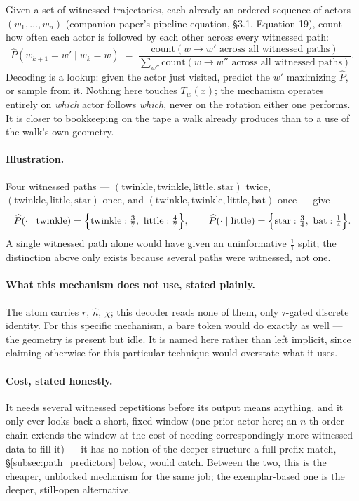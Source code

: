 \documentclass[12pt, a4paper]{article}
\begin{document}
Given a set of witnessed trajectories, each already an ordered
sequence of actors $(w_1,\ldots,w_n)$ (companion paper's
pipeline equation, \S3.1, Equation 19), count how often each actor is followed
by each other across every witnessed path:
\begin{equation}
    \widehat{P}(w_{k+1}=w' \mid w_k=w)
    \;=\;
    \frac{\mathrm{count}(w\to w' \text{ across all witnessed paths})}
         {\sum_{w''}\mathrm{count}(w\to w'' \text{ across all witnessed paths})}.
    \label{eq:markov}
\end{equation}
Decoding is a lookup: given the actor just visited, predict the $w'$
maximizing $\widehat P$, or sample from it. Nothing here touches
$T_w(x)$; the mechanism operates entirely on \emph{which} actor
follows \emph{which}, never on the rotation either one performs. It
is closer to bookkeeping on the tape a walk already produces than to
a use of the walk's own geometry.

\paragraph{Illustration.} Four witnessed paths ---
$(\text{twinkle},\text{twinkle},\text{little},\text{star})$ twice,
$(\text{twinkle},\text{little},\text{star})$ once, and
$(\text{twinkle},\text{twinkle},\text{little},\text{bat})$ once --- give
\[
\widehat P(\cdot\mid\text{twinkle}) =
\Bigl\{\text{twinkle}:\tfrac{3}{7},\ \text{little}:\tfrac{4}{7}\Bigr\},
\qquad
\widehat P(\cdot\mid\text{little}) =
\Bigl\{\text{star}:\tfrac{3}{4},\ \text{bat}:\tfrac{1}{4}\Bigr\}.
\]
A single witnessed path alone would have given an uninformative
$\tfrac{1}{1}$ split; the distinction above only exists because
several paths were witnessed, not one.

\paragraph{What this mechanism does not use, stated plainly.} The
atom carries $r$, $\hat n$, $\chi$; this decoder reads none of them,
only $\tau$-gated discrete identity. For this specific mechanism, a
bare token would do exactly as well --- the geometry is present but
idle. It is named here rather than left implicit, since claiming
otherwise for this particular technique would overstate what it
uses.

\paragraph{Cost, stated honestly.} It needs several witnessed
repetitions before its output means anything, and it only ever looks
back a short, fixed window (one prior actor here; an $n$-th order
chain extends the window at the cost of needing correspondingly more
witnessed data to fill it) --- it has no notion of the deeper
structure a full prefix match, \S\ref{subsec:path_predictors} below,
would catch. Between the two, this is the cheaper, unblocked
mechanism for the same job; the exemplar-based one is the deeper,
still-open alternative.
\end{document}
